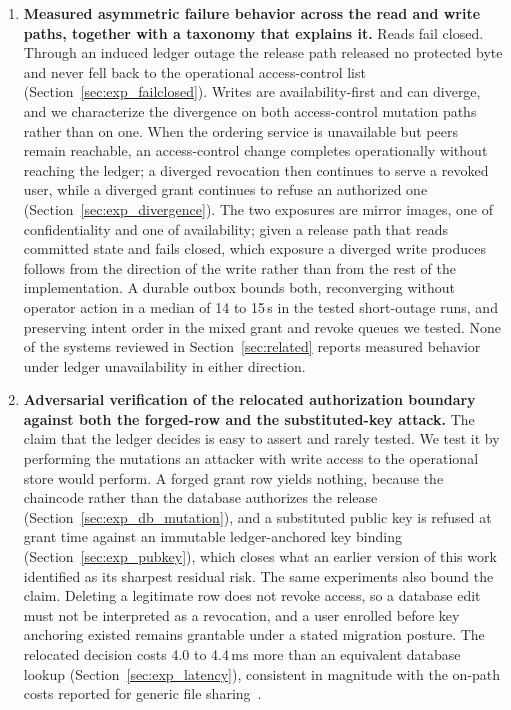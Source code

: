 \documentclass[preprint,12pt]{elsarticle}
\begin{document}
\begin{enumerate}

\item \textbf{Measured asymmetric failure behavior across the read and write
paths, together with a taxonomy that explains it.} Reads fail closed. Through an
induced ledger outage the release path released no protected byte and never fell
back to the operational access-control list (Section~\ref{sec:exp_failclosed}).
Writes are availability-first and can diverge, and we characterize the
divergence on both access-control mutation paths rather than on one. When the
ordering service is unavailable but peers remain reachable, an access-control
change completes operationally without reaching the ledger; a diverged
revocation then continues to serve a revoked user, while a diverged grant
continues to refuse an authorized one (Section~\ref{sec:exp_divergence}). The
two exposures are mirror images, one of confidentiality and one of
availability; given a release path that reads committed state and fails closed,
which exposure a diverged write produces follows from the direction of the
write rather than from the rest of the implementation. A durable outbox bounds
both, reconverging without operator action in a median of 14 to 15\,s in the
tested short-outage runs, and preserving intent order in the mixed grant and
revoke queues we tested. None of the systems reviewed in
Section~\ref{sec:related} reports measured behavior under ledger
unavailability in either direction.

\item \textbf{Adversarial verification of the relocated authorization boundary
against both the forged-row and the substituted-key attack.} The claim that the
ledger decides is easy to assert and rarely tested. We test it by performing
the mutations an attacker with write access to the operational store would
perform. A forged grant row yields nothing, because the chaincode rather than
the database authorizes the release (Section~\ref{sec:exp_db_mutation}), and a
substituted public key is refused at grant time against an immutable
ledger-anchored key binding (Section~\ref{sec:exp_pubkey}), which closes what
an earlier version of this work identified as its sharpest residual risk. The
same experiments also bound the claim. Deleting a legitimate row does not
revoke access, so a database edit must not be interpreted as a revocation, and
a user enrolled before key anchoring existed remains grantable under a stated
migration posture. The relocated decision costs 4.0 to 4.4\,ms more than an
equivalent database lookup (Section~\ref{sec:exp_latency}), consistent in
magnitude with the on-path costs reported for generic file
sharing~\cite{liu2026rbacipfs}.


\end{enumerate}
\end{document}
